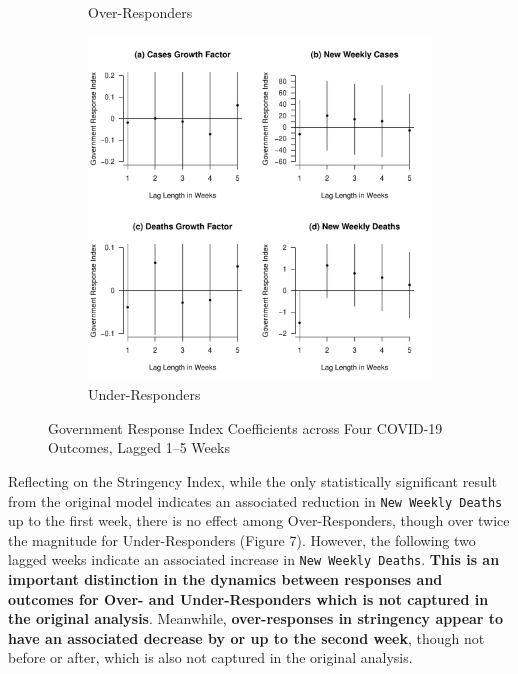 \documentclass[12pt,letterpaper]{article}
\begin{document}
\begin{figure}[p]
\begin{subfigure}[b]{0.48\textwidth}
			\caption{Over-Responders}
			\label{fig:agri}
		\end{subfigure}
		\begin{subfigure}[b]{0.48\textwidth}
			\centering
			\includegraphics[width=\textwidth]{bgri.pdf}
			\caption{Under-Responders}
			\label{fig:bgri}
		\end{subfigure}
		\caption{Government Response Index Coefficients across Four COVID-19 Outcomes, Lagged 1–5 Weeks}
		\label{fig:all_gri}
	\end{figure}

	\vspace{.25cm}
	
	\noindent Reflecting on the Stringency Index, while the only statistically significant result from the original model indicates an associated reduction in \texttt{New Weekly Deaths} up to the first week, there is no effect among Over-Responders, though over twice the magnitude for Under-Responders (Figure 7). However, the following two lagged weeks indicate an associated increase in \texttt{New Weekly Deaths}. \textbf{This is an important distinction in the dynamics between responses and outcomes for Over- and Under-Responders which is not captured in the original analysis}. Meanwhile, \textbf{over-responses in stringency appear to have an associated decrease by or up to the second week}, though not before or after, which is also not captured in the original analysis.
	
\end{document}
